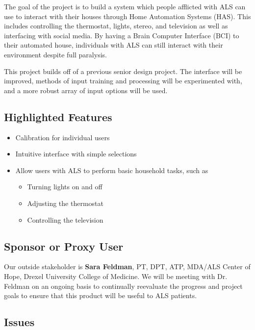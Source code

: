 \documentclass{report}
\begin{document}
The goal of the project is to build a system which people afflicted with ALS
can use to interact with their houses through Home Automation Systems (HAS).
This includes controlling the thermostat, lights, stereo, and television as
well as interfacing with social media. By having a Brain Computer Interface
(BCI) to their automated house, individuals with ALS can still interact with
their environment despite full paralysis.

This project builds off of a previous senior design project. The interface
will be improved, methods of input training and processing will be
experimented with, and a more robust array of input options will be used.

\subsection*{Highlighted Features}

\begin{itemize}
\item Calibration for individual users
\item Intuitive interface with simple selections
\item Allow users with ALS to perform basic household tasks, such as
    \begin{itemize}
        \item Turning lights on and off
        \item Adjusting the thermostat
        \item Controlling the television
    \end{itemize}
\end{itemize}

\subsection*{Sponsor or Proxy User}

Our outside stakeholder is \textbf{Sara Feldman}, PT, DPT, ATP, MDA/ALS Center
of Hope, Drexel University College of Medicine. We will be meeting with Dr.
Feldman on an ongoing basis to continually reevaluate the progress and
project goals to ensure that this product will be useful to ALS patients.

\subsection*{Issues}
\end{document}
